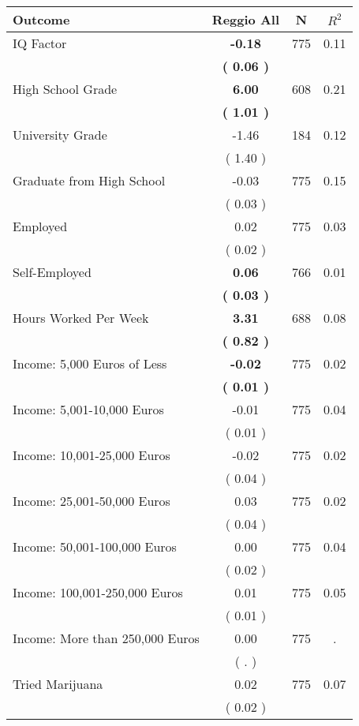 \begin{tabular}{lccc}
\toprule
 \textbf{Outcome} & \textbf{Reggio All} & \textbf{N} & \textbf{$ R^2$} \\
\midrule
IQ Factor & \textbf{    -0.18} & 775 &      0.11 \\ 
 & \textbf{(     0.06 )} & \\
High School Grade & \textbf{     6.00} & 608 &      0.21 \\ 
 & \textbf{(     1.01 )} & \\
University Grade &     -1.46 & 184 &      0.12 \\ 
 & (     1.40 ) & \\
Graduate from High School &     -0.03 & 775 &      0.15 \\ 
 & (     0.03 ) & \\
Employed &      0.02 & 775 &      0.03 \\ 
 & (     0.02 ) & \\
Self-Employed & \textbf{     0.06} & 766 &      0.01 \\ 
 & \textbf{(     0.03 )} & \\
Hours Worked Per Week & \textbf{     3.31} & 688 &      0.08 \\ 
 & \textbf{(     0.82 )} & \\
Income: 5,000 Euros of Less & \textbf{    -0.02} & 775 &      0.02 \\ 
 & \textbf{(     0.01 )} & \\
Income: 5,001-10,000 Euros &     -0.01 & 775 &      0.04 \\ 
 & (     0.01 ) & \\
Income: 10,001-25,000 Euros &     -0.02 & 775 &      0.02 \\ 
 & (     0.04 ) & \\
Income: 25,001-50,000 Euros &      0.03 & 775 &      0.02 \\ 
 & (     0.04 ) & \\
Income: 50,001-100,000 Euros &      0.00 & 775 &      0.04 \\ 
 & (     0.02 ) & \\
Income: 100,001-250,000 Euros &      0.01 & 775 &      0.05 \\ 
 & (     0.01 ) & \\
Income: More than 250,000 Euros &      0.00 & 775 &         . \\ 
 & (        . ) & \\
Tried Marijuana &      0.02 & 775 &      0.07 \\ 
 & (     0.02 ) & \\

\end{tabular}
